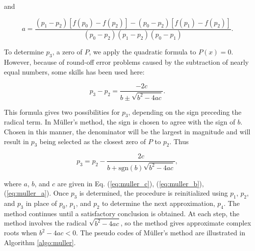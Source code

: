 \documentclass[preprint,12pt]{elsarticle}
\begin{document}
and

\begin{equation}
\label{eq:muller_a}
    a=\frac{(p_{1}-p_2)[f(p_0)-f(p_2)]-(p_{0}-p_2)[f(p_1)-f(p_2)]}{(p_{0}-p_2)(p_{1}-p_2)(p_{0}-p_1)}.
\end{equation}

To determine $p_3$, a zero of $P$, we apply the quadratic formula to $P(x)=0$. However, because of round-off error problems caused by the subtraction of nearly equal numbers, some skills has been used here:

\begin{equation}
    p_{3}-p_2=\frac{-2c}{b\pm\sqrt{b^{2}-4ac}}.
\end{equation}

This formula gives two possibilities for $p_3$, depending on the sign preceding the radical term. In M\"uller's method, the sign is chosen to agree with the sign of $b$. Chosen in this manner, the denominator will be the largest in magnitude and will result in $p_3$ being selected as the closest zero of $P$ to $p_2$. Thus 

\begin{equation}
    p_{3}=p_{2}-\frac{2c}{b+\mathrm{sgn}(b)\sqrt{b^{2}-4ac}},
\end{equation}

where $a$, $b$, and $c$ are given in Eq. (\ref{eq:muller_c}), (\ref{eq:muller_b}), (\ref{eq:muller_a}).
Once $p_3$ is determined, the procedure is reinitialized using $p_1$, $p_2$, and $p_3$ in place of $p_0$, $p_1$, and $p_2$ to determine the next approximation, $p_4$. The method continues until a satisfactory conclusion is obtained. At each step, the method involves the radical $\sqrt{b^{2}-4ac}$, so the method gives approximate complex roots when $b^{2}-4ac<0$. The pseudo codes of M\"uller's method are illustrated in Algorithm \ref{algo:muller}.
\end{document}
